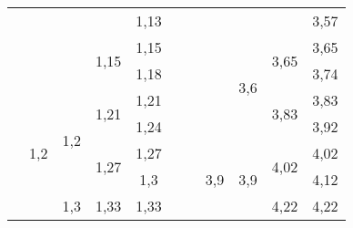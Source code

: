 \begin{table}[H]
\begin{tabular}{|c|c|c|c|c|c|c|c|c|c|c|}
                                    &                      &                      &                       & 1,13               &         &                                    &                       &                      &                       & 3,57               \\ \cline{4-5} \cline{9-11} 
                                    &                      &                      & \multirow{2}{*}{1,15} & 1,15               &         &                                    &                       & \multirow{4}{*}{3,6} & \multirow{2}{*}{3,65} & 3,65               \\ \cline{5-5} \cline{11-11} 
                                    &                      &                      &                       & 1,18               &         &                                    &                       &                      &                       & 3,74               \\ \cline{2-5} \cline{10-11} 
                                    & \multirow{8}{*}{1,2} & \multirow{4}{*}{1,2} & \multirow{2}{*}{1,21} & 1,21               &         &                                    &                       &                      & \multirow{2}{*}{3,83} & 3,83               \\ \cline{5-5} \cline{11-11} 
                                    &                      &                      &                       & 1,24               &         &                                    &                       &                      &                       & 3,92               \\ \cline{4-5} \cline{8-11} 
                                    &                      &                      & \multirow{2}{*}{1,27} & 1,27               &         &                                    & \multirow{8}{*}{3,9}  & \multirow{4}{*}{3,9} & \multirow{2}{*}{4,02} & 4,02               \\ \cline{5-5} \cline{11-11} 
                                    &                      &                      &                       & 1,3                &         &                                    &                       &                      &                       & 4,12               \\ \cline{3-5} \cline{10-11} 
                                    &                      & \multirow{4}{*}{1,3} & \multirow{2}{*}{1,33} & 1,33               &         &                                    &                       &                      & \multirow{2}{*}{4,22} & 4,22               \\ \cline{5-5} \cline{11-11} 

\end{tabular}
\end{table}
